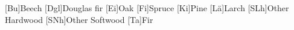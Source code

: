 \begin{acronym}

[Bu]{Beech} 
[Dgl]{Douglas fir}
[Ei]{Oak}
[Fi]{Spruce}
[Ki]{Pine}
[Lä]{Larch}
[SLh]{Other Hardwood}
[SNh]{Other Softwood}
[Ta]{Fir}

\end{acronym}